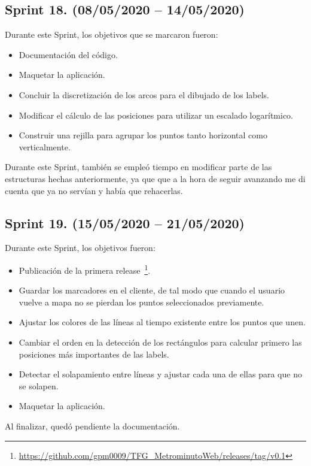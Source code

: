 \subsection{Sprint 18. (08/05/2020 -- 14/05/2020)}
Durante este Sprint, los objetivos que se marcaron fueron:
\begin{itemize}
	\item Documentación del código.
	\item Maquetar la aplicación.
	\item Concluir la discretización de los arcos para el dibujado de los labels.
	\item Modificar el cálculo de las posiciones para utilizar un escalado logarítmico.
	\item Construir una rejilla para agrupar los puntos tanto horizontal como verticalmente.
\end{itemize}
Durante este Sprint, también se empleó tiempo en modificar parte de las estructuras hechas anteriormente, ya que que a la hora de seguir avanzando me di cuenta que ya no servían y había que rehacerlas. 

\subsection{Sprint 19. (15/05/2020 -- 21/05/2020)}
Durante este Sprint, los objetivos fueron:
\begin{itemize}
	\item Publicación de la primera release~\footnote{\url{https://github.com/gpm0009/TFG_MetrominutoWeb/releases/tag/v0.1}}.
	\item Guardar los marcadores en el cliente, de tal modo que cuando el usuario vuelve a mapa no se pierdan los puntos seleccionados previamente.
	\item Ajustar los colores de las líneas al tiempo existente entre los puntos que unen.
	\item Cambiar el orden en la detección de los rectángulos para calcular primero las posiciones más importantes de las labels.
	\item Detectar el solapamiento entre líneas y ajustar cada una de ellas para que no se solapen.
	\item Maquetar la aplicación.
\end{itemize}
Al finalizar, quedó pendiente la documentación.

